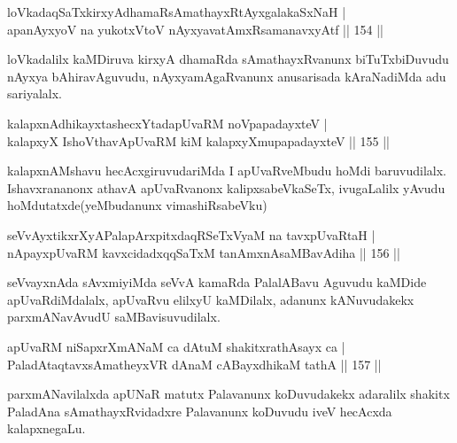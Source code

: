 
\begin{shl}
loVkadaqSaTxkirxyAdhamaRsAmathayxRtAyxgalakaSxNaH |\\
apanAyxyoV na yukotxV\s toV nAyxyavatAmxRsamanavxyAtf \hfill || 154 ||
\end{shl}

\begin{artha}
loVkadalilx kaMDiruva kirxyA dhamaRda sAmathayxRvanunx biTuTxbiDuvudu nAyxya bAhiravAguvudu, nAyxyamAgaRvanunx anusarisada kAraNadiMda adu sariyalalx.
\end{artha}

\begin{shl}
kalapxnAdhikayxtashecxYtadapUvaRM noVpapadayxteV  |\\
kalapxyX IshoV\s thavA\s pUvaRM kiM kalapxyXmupapadayxteV \hfill || 155 ||
\end{shl}

\begin{artha}
kalapxnAMshavu hecAcxgiruvudariMda I apUvaRveMbudu hoMdi baruvudilalx. Ishavxrananonx athavA apUvaRvanonx kalipxsabeVkaSeTx, ivugaLalilx yAvudu hoMdutatxde(yeMbudanunx vimashiRsabeVku)
\end{artha}


\begin{shl}
seVvAyxtikxrXyAPalapArxpitxdaqRSeTxVyaM na tavxpUvaRtaH |\\
nApayxpUvaRM kavxcidadxqqSaTxM tanAmxnAsaMBavAdiha \hfill || 156 ||
\end{shl}

\begin{artha}
seVvayxnAda sAvxmiyiMda seVvA kamaRda PalalABavu Aguvudu kaMDide  apUvaRdiMdalalx, apUvaRvu elilxyU kaMDilalx, adanunx kANuvudakekx parxmANavAvudU saMBavisuvudilalx.
\end{artha}

\begin{shl}
apUvaRM niSapxrXmANaM ca dAtuM shakitxrathAsayx ca |\\
PaladAtaqtavxsAmatheyxVR dAnaM cABayxdhikaM tathA \hfill || 157 ||
\end{shl}

\begin{artha}%
parxmANavilalxda apUNaR matutx Palavanunx koDuvudakekx adaralilx shakitx PaladAna sAmathayxRvidadxre Palavanunx koDuvudu iveV hecAcxda kalapxnegaLu.
\end{artha}


